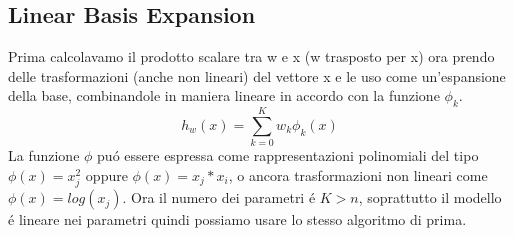 \documentclass{article}
\begin{document}
\subsection{Linear Basis Expansion}
Prima calcolavamo il prodotto scalare tra w e x (w trasposto per x) ora prendo delle trasformazioni (anche non lineari) del vettore x e le uso come un'espansione della base, combinandole in maniera lineare in accordo con la funzione $\phi_k$. 
\begin{equation}
    h_w(x)=\sum_{k=0}^K w_k \phi_k(x)
\end{equation}
La funzione $\phi$ puó essere espressa come rappresentazioni polinomiali del tipo $\phi(x)=x_j^2$ oppure $\phi(x)=x_j*x_i$, o ancora trasformazioni non lineari come $\phi(x)=log(x_j)$. Ora il numero dei parametri é $K>n$, soprattutto il modello é lineare nei parametri quindi possiamo usare lo stesso algoritmo di prima. 
\end{document}
